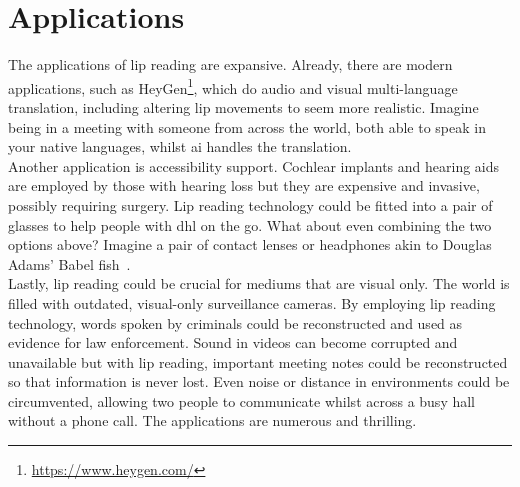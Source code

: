 \section{Applications}
The applications of lip reading are expansive. Already, there are modern applications, such as HeyGen\footnote{\url{https://www.heygen.com/}}, which do audio and visual multi-language translation, including altering lip movements to seem more realistic. Imagine being in a meeting with someone from across the world, both able to speak in your native languages, whilst \acrshort{ai} handles the translation.\\
Another application is accessibility support. Cochlear implants and hearing aids are employed by those with hearing loss but they are expensive and invasive, possibly requiring surgery. Lip reading technology could be fitted into a pair of glasses to help people with \acrshort{dhl} on the go. What about even combining the two options above? Imagine a pair of contact lenses or headphones akin to Douglas Adams' Babel fish~\cite{The_Hitch_Hiker's_Guide}.\\
Lastly, lip reading could be crucial for mediums that are visual only. The world is filled with outdated, visual-only surveillance cameras. By employing lip reading technology, words spoken by criminals could be reconstructed and used as evidence for law enforcement. Sound in videos can become corrupted and unavailable but with lip reading, important meeting notes could be reconstructed so that information is never lost. Even noise or distance in environments could be circumvented, allowing two people to communicate whilst across a busy hall without a phone call. The applications are numerous and thrilling.

